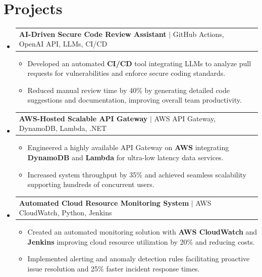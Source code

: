 \documentclass[letterpaper,11pt]{article}
\makeatletter
\newcommand{\resumeItem}[1]{
  \item\footnotesize{
    {#1 \vspace{-2pt}}
  }
}
\newcommand{\resumeProjectHeading}[2]{
    \item
    \begin{tabular*}{1.001\textwidth}{l@{\extracolsep{\fill}}r}
      \small#1 & \textbf{\small #2}\\
    \end{tabular*}\vspace{-7pt}
}
\newcommand{\resumeSubHeadingListStart}{\begin{itemize}[leftmargin=0pt, label={}]}
\newcommand{\resumeSubHeadingListEnd}{\end{itemize}}
\newcommand{\resumeItemListStart}{\begin{itemize}[leftmargin=*]}
\newcommand{\resumeItemListEnd}{\end{itemize}\vspace{-5pt}}
\makeatother
\begin{document}
\section{Projects}
    \vspace{-5pt}
    \resumeSubHeadingListStart
          \resumeProjectHeading
              {\textbf{AI-Driven Secure Code Review Assistant} $|$ GitHub Actions, OpenAI API, LLMs, CI/CD}{}
        \resumeItemListStart
            \resumeItem{Developed an automated \textbf{CI/CD} tool integrating LLMs to analyze pull requests for vulnerabilities and enforce secure coding standards.}
            \resumeItem{Reduced manual review time by 40\% by generating detailed code suggestions and documentation, improving overall team productivity.}
        \resumeItemListEnd
        \vspace{-12pt}
    
    \resumeProjectHeading
        {\textbf{AWS-Hosted Scalable API Gateway} $|$ AWS API Gateway, DynamoDB, Lambda, .NET}{}
        \resumeItemListStart
            \resumeItem{Engineered a highly available API Gateway on \textbf{AWS} integrating \textbf{DynamoDB} and \textbf{Lambda} for ultra-low latency data services.}
            \resumeItem{Increased system throughput by 35\% and achieved seamless scalability supporting hundreds of concurrent users.}
        \resumeItemListEnd
          \vspace{-12pt}
      \resumeProjectHeading
          {\textbf{Automated Cloud Resource Monitoring System} $|$ AWS CloudWatch, Python, Jenkins}{}
          \resumeItemListStart
              \resumeItem{Created an automated monitoring solution with \textbf{AWS CloudWatch} and \textbf{Jenkins} improving cloud resource utilization by 20\% and reducing costs.}
              \resumeItem{Implemented alerting and anomaly detection rules facilitating proactive issue resolution and 25\% faster incident response times.}
          \resumeItemListEnd 
    \resumeSubHeadingListEnd
\end{document}
